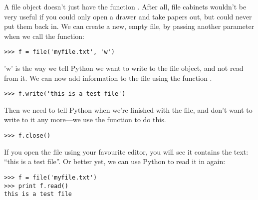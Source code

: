 A file object doesn't just have the function . After all, file cabinets wouldn't be very useful if you could only open a drawer and take papers out, but could never put them back in. We can create a new, empty file, by passing another parameter when we call the  function:

\begin{listing}
\begin{verbatim}
>>> f = file('myfile.txt', 'w')
\end{verbatim}
\end{listing}

'w' is the way we tell Python we want to write to the file object, and not read from it.  We can now add information to the file using the function .

\begin{listing}
\begin{verbatim}
>>> f.write('this is a test file')
\end{verbatim}
\end{listing}

Then we need to tell Python when we're finished with the file, and don't want to write to it any more---we use the function  to do this.

\begin{listing}
\begin{verbatim}
>>> f.close()
\end{verbatim}
\end{listing}

If you open the file using your favourite editor, you will see it contains the text: ``this is a test file''.  Or better yet, we can use Python to read it in again:

\begin{listing}
\begin{verbatim}
>>> f = file('myfile.txt')
>>> print f.read()
this is a test file
\end{verbatim}
\end{listing}

\newpage